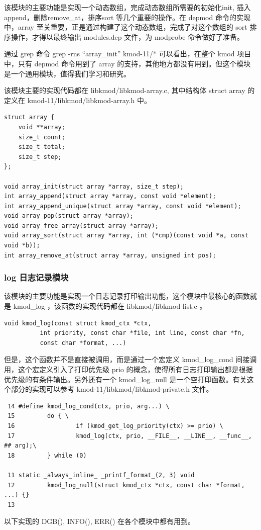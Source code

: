 \documentclass[11pt,a4paper]{article}
\begin{document}
该模块的主要功能是实现一个动态数组，完成动态数组所需要的初始化init,
插入append，删除remove\_at，排序sort 等几个重要的操作。在 depmod
命令的实现中，array
至关重要，正是通过构建了这个动态数组，完成了对这个数组的 sort
排序操作，才得以最终输出 modules.dep 文件，为 modprobe 命令做好了准备。

通过 grep 命令 grep -rns ``array\_init'' kmod-11/* 可以看出，在整个 kmod
项目中，只有 depmod 命令用到了 array
的支持，其他地方都没有用到。但这个模块是一个通用模块，值得我们学习和研究。

该模块主要的实现代码都在 libkmod/libkmod-array.c, 其中结构体 struct
array 的定义在 kmod-11/libkmod/libkmod-array.h 中。

{\begin{shaded}\begin{verbatim}
struct array {
    void **array;
    size_t count;
    size_t total;
    size_t step;
};

void array_init(struct array *array, size_t step);
int array_append(struct array *array, const void *element);
int array_append_unique(struct array *array, const void *element);
void array_pop(struct array *array);
void array_free_array(struct array *array);
void array_sort(struct array *array, int (*cmp)(const void *a, const void *b));
int array_remove_at(struct array *array, unsigned int pos); 
\end{verbatim}\end{shaded}}
\subsubsection{log 日志记录模块}

该模块的主要功能是实现一个日志记录打印输出功能，这个模块中最核心的函数就是
kmod\_log ，该函数的实现代码都在 libkmod/libkmod-list.c 。

{\begin{shaded}\begin{verbatim}
void kmod_log(const struct kmod_ctx *ctx,
          int priority, const char *file, int line, const char *fn,
          const char *format, ...)
\end{verbatim}\end{shaded}}
但是，这个函数并不是直接被调用，而是通过一个宏定义 kmod\_log\_cond
间接调用，这个宏定义引入了打印优先级 prio
的概念，使得所有日志打印输出都是根据优先级的有条件输出。另外还有一个
kmod\_log\_null 是一个空打印函数。有关这个部分的实现可以参考
kmod-11/libkmod/libkmod-private.h 文件。

{\begin{shaded}\begin{verbatim}
 14 #define kmod_log_cond(ctx, prio, arg...) \
 15         do { \
 16                 if (kmod_get_log_priority(ctx) >= prio) \
 17                 kmod_log(ctx, prio, __FILE__, __LINE__, __func__, ## arg);\
 18         } while (0)

 11 static _always_inline_ _printf_format_(2, 3) void
 12         kmod_log_null(struct kmod_ctx *ctx, const char *format, ...) {}
 13
\end{verbatim}\end{shaded}}
以下实现的 DGB(), INFO(), ERR() 在各个模块中都有用到。
\end{document}
